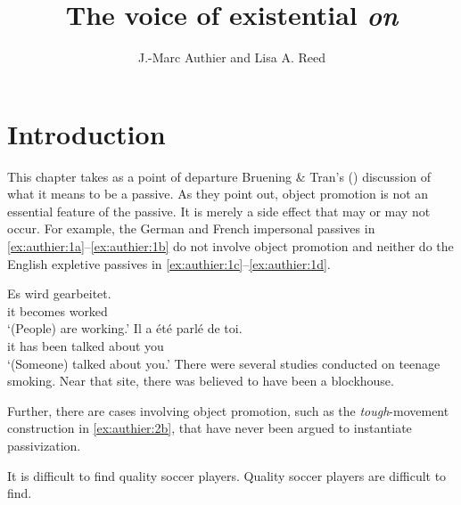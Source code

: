 \documentclass[output=paper,colorlinks,citecolor=brown]{langscibook}
\title{The voice of existential \textit{on}}
\author{
    J.-Marc Authier\affiliation{The Pennsylvania State University}
    and 
    Lisa A. Reed\affiliation{The Pennsylvania State University}
}
\begin{document}
\maketitle

\section{Introduction}

This chapter takes as a point of departure Bruening \& Tran’s (\citeyear{bruening2015a}) discussion of what it means to be a passive. As they point out, object promotion is not an essential feature of the passive. It is merely a side effect that may or may not occur. For example, the German and French impersonal passives in \ref{ex:authier:1a}--\ref{ex:authier:1b} do not involve object promotion and neither do the English expletive passives in \ref{ex:authier:1c}--\ref{ex:authier:1d}.


\begin{exe} %
    \ex\label{ex:authier:1} %
    \begin{xlist} %
        \ex\label{ex:authier:1a} %
            \gll    Es wird gearbeitet. \\   %
                    it becomes worked \\    %
            \glt    `(People) are working.' %
        \ex\label{ex:authier:1b}
            \gll    Il a \'{e}t\'{e} parl\'{e} de toi. \\
                    it has been talked about you \\
            \glt    `(Someone) talked about you.'
        \ex\label{ex:authier:1c} There were several studies conducted on teenage smoking. 
        \ex\label{ex:authier:1d} Near that site, there was believed to have been a blockhouse.
    \end{xlist}
\end{exe}


Further, there are cases involving object promotion, such as the \textit{tough}{}-movement construction in \ref{ex:authier:2b}, that have never been argued to instantiate passivization.


\begin{exe}
\ex\label{ex:authier:2}
\begin{xlist}
\ex\label{ex:authier:2a} It is difficult to find quality soccer players.
\ex\label{ex:authier:2b} Quality soccer players are difficult to find. 
\end{xlist}
\end{exe}
\end{document}
